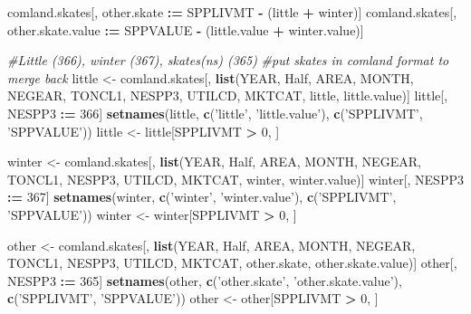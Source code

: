 \documentclass[]{article}
\newenvironment{Shaded}{\begin{snugshade}}{\end{snugshade}}
\newcommand{\KeywordTok}[1]{\textcolor[rgb]{0.13,0.29,0.53}{\textbf{#1}}}
\newcommand{\DecValTok}[1]{\textcolor[rgb]{0.00,0.00,0.81}{#1}}
\newcommand{\StringTok}[1]{\textcolor[rgb]{0.31,0.60,0.02}{#1}}
\newcommand{\CommentTok}[1]{\textcolor[rgb]{0.56,0.35,0.01}{\textit{#1}}}
\newcommand{\OperatorTok}[1]{\textcolor[rgb]{0.81,0.36,0.00}{\textbf{#1}}}
\newcommand{\ErrorTok}[1]{\textcolor[rgb]{0.64,0.00,0.00}{\textbf{#1}}}
\newcommand{\NormalTok}[1]{#1}
\begin{document}
\begin{Shaded}
\begin{Highlighting}[]
{{{{\NormalTok{comland.skates[, other.skate       }\OperatorTok{:}\ErrorTok{=}\StringTok{ }\NormalTok{SPPLIVMT }\OperatorTok{-}\StringTok{ }\NormalTok{(little       }\OperatorTok{+}\StringTok{ }\NormalTok{winter)]}
\NormalTok{comland.skates[, other.skate.value }\OperatorTok{:}\ErrorTok{=}\StringTok{ }\NormalTok{SPPVALUE }\OperatorTok{-}\StringTok{ }\NormalTok{(little.value }\OperatorTok{+}\StringTok{ }\NormalTok{winter.value)]}

\CommentTok{#Little (366), winter (367), skates(ns) (365)}
\CommentTok{#put skates in comland format to merge back}
\NormalTok{little <-}\StringTok{ }\NormalTok{comland.skates[, }\KeywordTok{list}\NormalTok{(YEAR, Half, AREA, MONTH, NEGEAR,}
\NormalTok{                                TONCL1, NESPP3, UTILCD, MKTCAT, little, }
\NormalTok{                                little.value)]}
\NormalTok{little[, NESPP3 }\OperatorTok{:}\ErrorTok{=}\StringTok{ }\DecValTok{366}\NormalTok{]}
\KeywordTok{setnames}\NormalTok{(little, }\KeywordTok{c}\NormalTok{(}\StringTok{'little'}\NormalTok{, }\StringTok{'little.value'}\NormalTok{), }\KeywordTok{c}\NormalTok{(}\StringTok{'SPPLIVMT'}\NormalTok{, }\StringTok{'SPPVALUE'}\NormalTok{))}
\NormalTok{little <-}\StringTok{ }\NormalTok{little[SPPLIVMT }\OperatorTok{>}\StringTok{ }\DecValTok{0}\NormalTok{, ]}

\NormalTok{winter <-}\StringTok{ }\NormalTok{comland.skates[, }\KeywordTok{list}\NormalTok{(YEAR, Half, AREA, MONTH, NEGEAR,}
\NormalTok{                                TONCL1, NESPP3, UTILCD, MKTCAT, winter, }
\NormalTok{                                winter.value)]}
\NormalTok{winter[, NESPP3 }\OperatorTok{:}\ErrorTok{=}\StringTok{ }\DecValTok{367}\NormalTok{]}
\KeywordTok{setnames}\NormalTok{(winter, }\KeywordTok{c}\NormalTok{(}\StringTok{'winter'}\NormalTok{, }\StringTok{'winter.value'}\NormalTok{), }\KeywordTok{c}\NormalTok{(}\StringTok{'SPPLIVMT'}\NormalTok{, }\StringTok{'SPPVALUE'}\NormalTok{))}
\NormalTok{winter <-}\StringTok{ }\NormalTok{winter[SPPLIVMT }\OperatorTok{>}\StringTok{ }\DecValTok{0}\NormalTok{, ]}

\NormalTok{other <-}\StringTok{ }\NormalTok{comland.skates[, }\KeywordTok{list}\NormalTok{(YEAR, Half, AREA, MONTH, NEGEAR,}
\NormalTok{                               TONCL1, NESPP3, UTILCD, MKTCAT, other.skate, }
\NormalTok{                               other.skate.value)]}
\NormalTok{other[, NESPP3 }\OperatorTok{:}\ErrorTok{=}\StringTok{ }\DecValTok{365}\NormalTok{]}
\KeywordTok{setnames}\NormalTok{(other, }\KeywordTok{c}\NormalTok{(}\StringTok{'other.skate'}\NormalTok{, }\StringTok{'other.skate.value'}\NormalTok{), }\KeywordTok{c}\NormalTok{(}\StringTok{'SPPLIVMT'}\NormalTok{, }\StringTok{'SPPVALUE'}\NormalTok{))}
\NormalTok{other <-}\StringTok{ }\NormalTok{other[SPPLIVMT }\OperatorTok{>}\StringTok{ }\DecValTok{0}\NormalTok{, ]}

}}}}
\end{Highlighting}
\end{Shaded}
\end{document}
